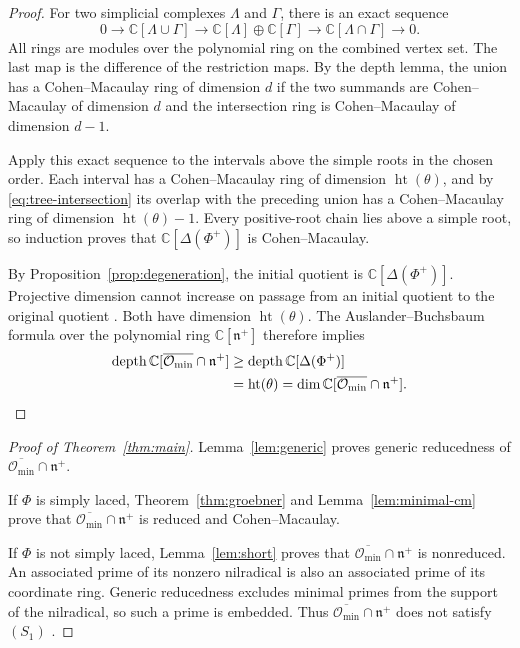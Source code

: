 \documentclass[12pt]{article}
\theoremstyle{definition}
\DeclareMathOperator{\height}{ht}
\newcommand{\C}{\mathbb C}
\newcommand{\n}{\mathfrak n^{+}}
\newcommand{\oc}{\overline{\mathcal O_{\min}}}
\begin{document}
\begin{proof}
    For two simplicial complexes $\Lambda$ and $\Gamma$, there is an exact sequence
    $$
        0\longrightarrow\C[\Lambda\cup\Gamma]
        \longrightarrow\C[\Lambda]\oplus\C[\Gamma]
        \longrightarrow\C[\Lambda\cap\Gamma]
        \longrightarrow0.
    $$
    All rings are modules over the polynomial ring on the combined vertex set. The last map is the difference of the restriction maps. By the depth lemma, the union has a Cohen--Macaulay ring of dimension $d$ if the two summands are Cohen--Macaulay of dimension $d$ and the intersection ring is Cohen--Macaulay of dimension $d-1$.

    Apply this exact sequence to the intervals above the simple roots in the chosen order. Each interval has a Cohen--Macaulay ring of dimension $\height(\theta)$, and by \eqref{eq:tree-intersection} its overlap with the preceding union has a Cohen--Macaulay ring of dimension $\height(\theta)-1$. Every positive-root chain lies above a simple root, so induction proves that $\C[\Delta(\Phi^+)]$ is Cohen--Macaulay.

    By Proposition~\ref{prop:degeneration}, the initial quotient is $\C[\Delta(\Phi^+)]$. Projective dimension cannot increase on passage from an initial quotient to the original quotient \cite[Theorem~22.9(2)]{Pee11}. Both have dimension $\height(\theta)$. The Auslander--Buchsbaum formula over the polynomial ring $\C[\n]$ therefore implies
    \begin{align*}
        \operatorname{depth}\C[\oc\cap\n]
        &\geq\operatorname{depth}\C[\Delta(\Phi^+)]\\
        &=\height(\theta)
        =\dim\C[\oc\cap\n].\qedhere
    \end{align*}
\end{proof}

\begin{proof}[Proof of Theorem~\ref{thm:main}]
    Lemma~\ref{lem:generic} proves generic reducedness of $\oc\cap\n$.

    If $\Phi$ is simply laced, Theorem~\ref{thm:groebner} and Lemma~\ref{lem:minimal-cm} prove that $\oc\cap\n$ is reduced and Cohen--Macaulay.

    If $\Phi$ is not simply laced, Lemma~\ref{lem:short} proves that $\oc\cap\n$ is nonreduced. An associated prime of its nonzero nilradical is also an associated prime of its coordinate ring. Generic reducedness excludes minimal primes from the support of the nilradical, so such a prime is embedded. Thus $\oc\cap\n$ does not satisfy $(S_1)$ \cite[Tag~031Q]{Stacks}.
\end{proof}
\end{document}
